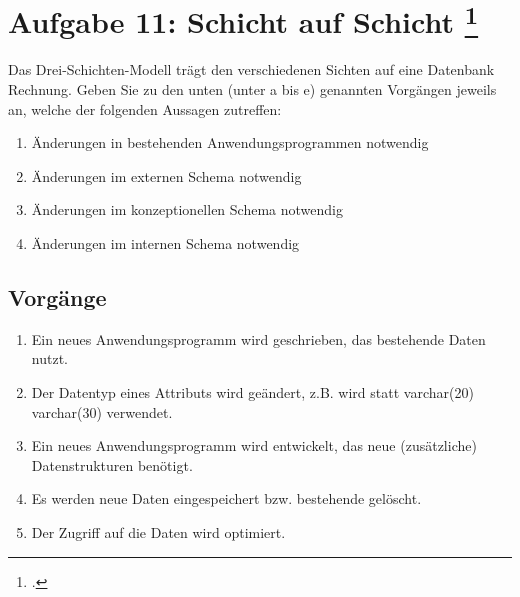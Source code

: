 \documentclass{lehramt-informatik-aufgabe}
\begin{document}

\section{Aufgabe 11: Schicht auf Schicht
\footcite{db:ab:klausurvorbereitung}}

Das Drei-Schichten-Modell trägt den verschiedenen Sichten auf eine
Datenbank Rechnung. Geben Sie zu den unten (unter a bis e) genannten
Vorgängen jeweils an, welche
der folgenden Aussagen zutreffen:

\begin{enumerate}
\item Änderungen in bestehenden Anwendungsprogrammen notwendig
\item Änderungen im externen Schema notwendig
\item Änderungen im konzeptionellen Schema notwendig
\item Änderungen im internen Schema notwendig
\end{enumerate}

\subsection{Vorgänge}

\begin{enumerate}


\item Ein neues Anwendungsprogramm wird geschrieben, das bestehende
Daten nutzt.


\item Der Datentyp eines Attributs wird geändert, z.B. wird statt
varchar(20) varchar(30) verwendet.


\item Ein neues Anwendungsprogramm wird entwickelt, das neue
(zusätzliche) Datenstrukturen benötigt.


\item Es werden neue Daten eingespeichert bzw. bestehende gelöscht.


\item Der Zugriff auf die Daten wird optimiert.
\end{enumerate}
\end{document}
